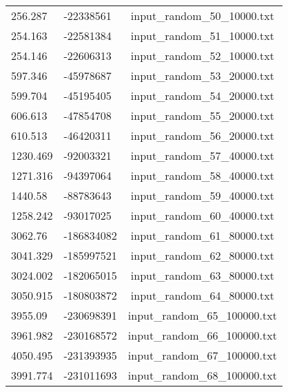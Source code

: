 \begin{longtable}[hb]{|l|l|c|}
    256.287 & -22338561 & input\_random\_50\_10000.txt \\
    254.163 & -22581384 & input\_random\_51\_10000.txt \\
    254.146 & -22606313 & input\_random\_52\_10000.txt \\
    597.346 & -45978687 & input\_random\_53\_20000.txt \\
    599.704 & -45195405 & input\_random\_54\_20000.txt \\
    606.613 & -47854708 & input\_random\_55\_20000.txt \\
    610.513 & -46420311 & input\_random\_56\_20000.txt \\
    1230.469 & -92003321 & input\_random\_57\_40000.txt \\
    1271.316 & -94397064 & input\_random\_58\_40000.txt \\
    1440.58 & -88783643 & input\_random\_59\_40000.txt \\
    1258.242 & -93017025 & input\_random\_60\_40000.txt \\
    3062.76 & -186834082 & input\_random\_61\_80000.txt \\
    3041.329 & -185997521 & input\_random\_62\_80000.txt \\
    3024.002 & -182065015 & input\_random\_63\_80000.txt \\
    3050.915 & -180803872 & input\_random\_64\_80000.txt \\
    3955.09 & -230698391 & input\_random\_65\_100000.txt \\
    3961.982 & -230168572 & input\_random\_66\_100000.txt \\
    4050.495 & -231393935 & input\_random\_67\_100000.txt \\
    3991.774 & -231011693 & input\_random\_68\_100000.txt \\
    \hline
\end{longtable}
